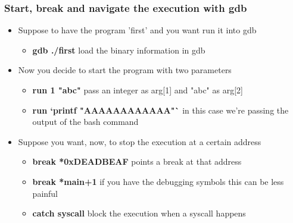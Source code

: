 \documentclass[]{beamer}
\begin{document}
      \begin{frame}
        \frametitle{Start, break and navigate the execution with gdb}
        \begin{itemize}
            \item{Suppose to have the program 'first' and you want run it into gdb }\\
            \begin{itemize}
                \item{{\bf gdb ./first} load the binary information in gdb}
            \end{itemize}
            \item{Now you decide to start the program with two parameters}\\
            \begin{itemize}
                \item{{\bf run 1 "abc"} pass an integer as arg[1] and "abc" as arg[2]}
                \item{{\bf run `printf "AAAAAAAAAAAA"`} in this case we're passing the output of the bash command}
            \end{itemize}
            \item{Suppose you want, now, to stop the execution at a certain address}\\
            \begin{itemize}
                \item{{\bf break *0xDEADBEAF} points a break at that address}
                \item{{\bf break *main+1} if you have the debugging symbols this can be less painful}
                \item{{\bf catch syscall} block the execution when a syscall happens}
            \end{itemize}
        \end{itemize}
      \end{frame}
\end{document}
